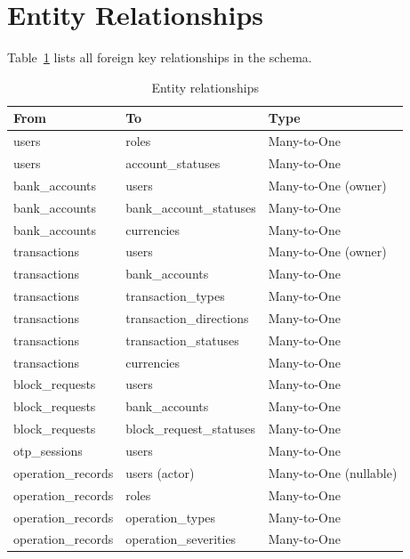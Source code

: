 \documentclass[12pt,a4paper]{report}
\begin{document}
\section{Entity Relationships}

Table~\ref{tab:rels} lists all foreign key relationships in the schema.

\begin{table}[H]
  \centering
  \caption{Entity relationships}
  \label{tab:rels}
  \begin{tabular}{lll}
    \toprule
    \textbf{From} & \textbf{To} & \textbf{Type} \\
    \midrule
    users                & roles                   & Many-to-One \\
    users                & account\_statuses        & Many-to-One \\
    bank\_accounts       & users                   & Many-to-One (owner) \\
    bank\_accounts       & bank\_account\_statuses  & Many-to-One \\
    bank\_accounts       & currencies              & Many-to-One \\
    transactions         & users                   & Many-to-One (owner) \\
    transactions         & bank\_accounts           & Many-to-One \\
    transactions         & transaction\_types       & Many-to-One \\
    transactions         & transaction\_directions  & Many-to-One \\
    transactions         & transaction\_statuses    & Many-to-One \\
    transactions         & currencies              & Many-to-One \\
    block\_requests      & users                   & Many-to-One \\
    block\_requests      & bank\_accounts           & Many-to-One \\
    block\_requests      & block\_request\_statuses & Many-to-One \\
    otp\_sessions        & users                   & Many-to-One \\
    operation\_records   & users (actor)           & Many-to-One (nullable) \\
    operation\_records   & roles                   & Many-to-One \\
    operation\_records   & operation\_types         & Many-to-One \\
    operation\_records   & operation\_severities    & Many-to-One \\
    \bottomrule
  \end{tabular}
\end{table}
\end{document}
